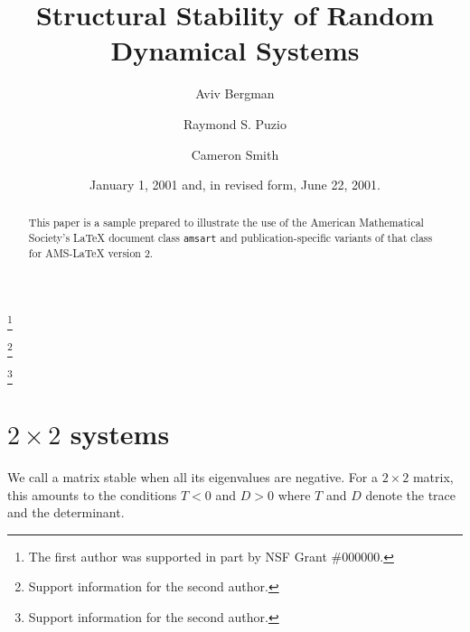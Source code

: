 \documentclass{amsart}
\theoremstyle{definition}
\theoremstyle{remark}
\numberwithin{equation}{section}
\begin{document}
\title{Structural Stability of Random Dynamical Systems}

\author{Aviv Bergman}
\address{Department of Systems and Computational Biology, Albert Einstein College of Medicine, Bronx, New York 10461}
\curraddr{}
\thanks{The first author was supported in part by NSF Grant \#000000.}

\author{Raymond S. Puzio}
\address{Department of Systems and Computational Biology, Albert Einstein College of Medicine, Bronx, New York 10461}
\curraddr{}
\thanks{Support information for the second author.}

\author{Cameron Smith}
\address{Department of Systems and Computational Biology, Albert Einstein College of Medicine, Bronx, New York 10461}
\curraddr{}
\thanks{Support information for the second author.}


\date{January 1, 2001 and, in revised form, June 22, 2001.}



\begin{abstract}
This paper is a sample prepared to illustrate the use of the American
Mathematical Society's \LaTeX{} document class \texttt{amsart} and
publication-specific variants of that class for AMS-\LaTeX{} version 2.
\end{abstract}

\maketitle

\section{$2 \times 2$ systems}
We call a matrix stable when all its eigenvalues are negative.  For a
$2 \times 2$ matrix, this amounts to the conditions $T < 0$ and $D >
0$ where $T$ and $D$ denote the trace and the determinant.
\end{document}
